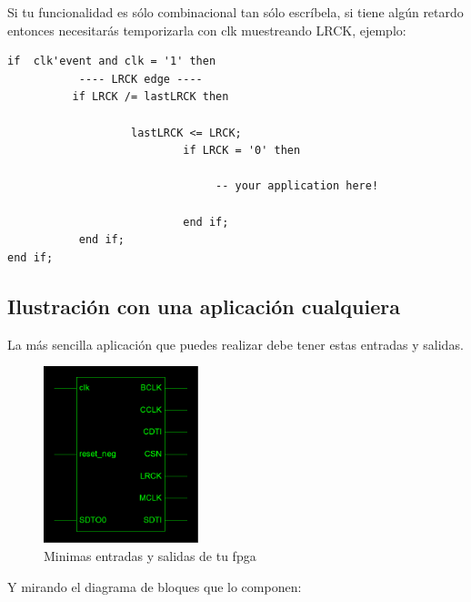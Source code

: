 	Si tu funcionalidad es sólo combinacional tan sólo escríbela, si tiene algún retardo entonces necesitarás temporizarla con clk muestreando LRCK, ejemplo:
	\begin{verbatim}
if  clk'event and clk = '1' then			
           ---- LRCK edge ----
          if LRCK /= lastLRCK then
					
                   lastLRCK <= LRCK;			
                           if LRCK = '0' then
                           
                                -- your application here!	
                                
                           end if;
           end if;
end if;
\end{verbatim}


	\subsection{Ilustración con una aplicación cualquiera}
		La más sencilla aplicación que puedes realizar debe tener estas entradas y salidas.\\
		\begin{figure}[H]
\begin{center}
	\includegraphics[width=0.4\textwidth]{./entity_fpga}
\caption{Minimas entradas y salidas de tu fpga}
\end{center}
\end{figure}
Y mirando el diagrama de bloques que lo componen:
